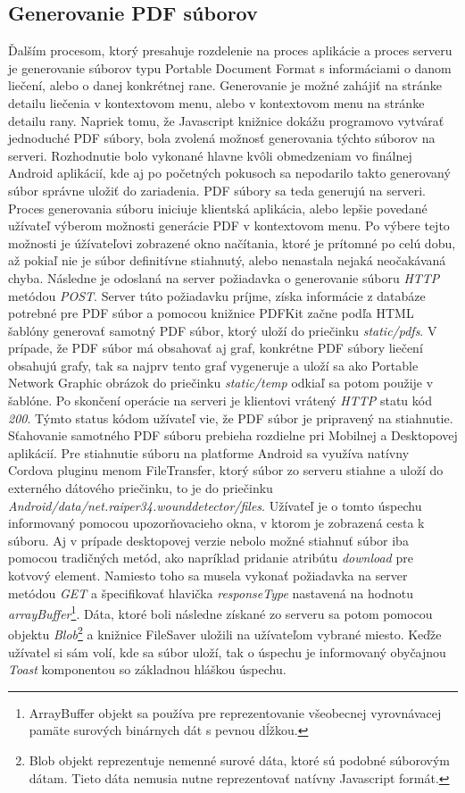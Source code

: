 \subsection{Generovanie PDF súborov}
Ďalším procesom, ktorý presahuje rozdelenie na proces aplikácie a proces serveru je generovanie súborov typu Portable Document Format s informáciami o danom liečení, alebo o danej konkrétnej rane. Generovanie je možné zahájiť na stránke detailu liečenia v kontextovom menu, alebo v kontextovom  menu na stránke detailu rany. Napriek tomu, že Javascript knižnice dokážu programovo vytvárať jednoduché PDF súbory, bola zvolená možnosť generovania týchto súborov na serveri. Rozhodnutie bolo vykonané hlavne kvôli obmedzeniam vo finálnej Android aplikácií, kde aj po početných pokusoch sa nepodarilo takto generovaný súbor správne uložiť do zariadenia. PDF súbory sa teda generujú na serveri. Proces generovania súboru iniciuje klientská aplikácia, alebo lepšie povedané užívateľ výberom možnosti generácie PDF v kontextovom menu. Po výbere tejto možnosti je úžívateľovi zobrazené okno načítania, ktoré je prítomné po celú dobu, až pokiaľ nie je súbor definitívne stiahnutý, alebo nenastala nejaká neočakávaná chyba. Následne je odoslaná na server požiadavka o generovanie súboru \textit{HTTP} metódou \textit{POST}. Server túto požiadavku príjme, získa informácie z databáze potrebné pre PDF súbor a pomocou knižnice PDFKit začne podľa HTML šablóny generovať samotný PDF súbor, ktorý uloží do priečinku \textit{static/pdfs}. V prípade, že PDF súbor má obsahovať aj graf, konkrétne PDF súbory liečení obsahujú grafy, tak sa najprv tento graf vygeneruje a uloží sa ako Portable Network Graphic obrázok do priečinku \textit{static/temp} odkiaľ sa potom použije v šablóne.  Po skončení operácie na serveri je klientovi vrátený \textit{HTTP} statu kód \textit{200}. Týmto status kódom užívateľ vie, že PDF súbor je pripravený na stiahnutie. Sťahovanie samotného PDF súboru prebieha rozdielne pri Mobilnej a Desktopovej aplikácií. Pre stiahnutie súboru na platforme Android sa využíva natívny Cordova pluginu menom FileTransfer, ktorý súbor zo serveru stiahne a uloží do externého dátového priečinku, to je do priečinku \textit{Android/data/net.raiper34.wounddetector/files}. Užívateľ je o tomto úspechu informovaný pomocou upozorňovacieho okna, v ktorom je zobrazená cesta k súboru. Aj v prípade  desktopovej verzie nebolo možné stiahnuť súbor iba pomocou tradičných metód, ako napríklad pridanie atribútu \textit{download} pre kotvový element. Namiesto toho sa musela vykonať požiadavka na server metódou \textit{GET} a špecifikovať hlavička \textit{responseType} nastavená na hodnotu \textit{arrayBuffer}\footnote{ArrayBuffer objekt sa používa pre reprezentovanie všeobecnej vyrovnávacej pamäte surových binárnych dát s pevnou dĺžkou.\cite{lkToNI4tHykidWsV}}. Dáta, ktoré boli následne získané zo serveru sa potom pomocou  objektu \textit{Blob}\footnote{Blob objekt reprezentuje nemenné surové dáta, ktoré sú podobné súborovým dátam. Tieto dáta nemusia nutne reprezentovať natívny Javascript formát.\cite{m3Dxu36mfpc2MCxI}} a knižnice FileSaver uložili na užívateľom vybrané miesto. Keďže užívatel si sám volí, kde sa súbor uloží, tak o úspechu je informovaný obyčajnou \textit{Toast} komponentou so základnou hláškou úspechu.

